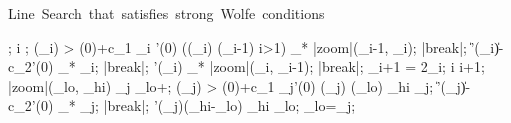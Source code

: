 \begin{algorithm}
    \mbox{Line Search that satisfies strong Wolfe conditions}
    \begin{program}
        \BEGIN
        ;
        i ;
         \DO
        \IF \phi(\alpha_i) > \phi(0)+c_1 \alpha_i \phi'(0) \OR
            (\phi(\alpha_i) \ge \phi(\alpha_{i-1}) \AND i>1)
        \THEN
            \alpha_* \leftarrow |zoom|(\alpha_{i-1}, \alpha_i);
            |break|;
        \FI
        \IF \|\phi'(\alpha_i)\| \le -c_2\phi'(0)
        \THEN
            \alpha_* \leftarrow \alpha_i;
            |break|;
        \FI
        \IF \phi'(\alpha_i) 
        \THEN
            \alpha_* \leftarrow |zoom|(\alpha_i, \alpha_{i-1});
            |break|;
        \FI
        \alpha_{i+1} = 2\alpha_i;
        i \leftarrow i+1;
        \OD
        \WHERE
        \FUNCT |zoom|(\alpha_{lo}, \alpha_{hi}) \BODY
             \DO
                \EXP \alpha_j \leftarrow \alpha_{lo}+;
                \IF \phi(\alpha_j) > \phi(0)+c_1 \alpha_j\phi'(0) \OR %
                    \phi(\alpha_j) \ge \phi(\alpha_{lo})
                \THEN
                    \alpha_{hi} \leftarrow \alpha_j;
                \ELSE
                    \IF \|\phi'(\alpha_j)\| \le -c_2\phi'(0)
                    \THEN
                        \alpha_* \leftarrow \alpha_j;
                        |break|;
                    \FI
                    \IF \phi'(\alpha_j)(\alpha_{hi}-\alpha_{lo}) 
                    \THEN
                        \alpha_{hi} \leftarrow \alpha_{lo};
                    \FI
                    \alpha_{lo}=\alpha_j;
                \FI
            \OD
            \ENDEXP \ENDFUNCT
        \END
    \end{program}
\end{algorithm}



